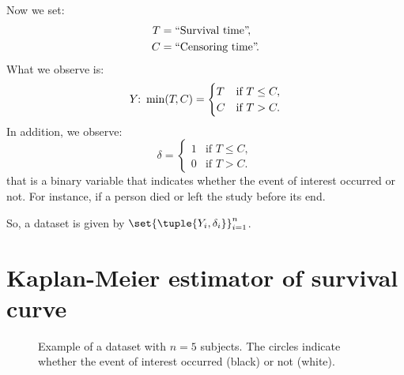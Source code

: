 Now we set:
\begin{equation}
    \begin{aligned}
        T & = \text{``Survival time''}\negthinspace,  \\
        C & = \text{``Censoring time''}\negthinspace.
    \end{aligned}
\end{equation}
What we observe is:
\begin{equation}
    Y\negthinspace\colon \min(T\negthinspace, C) = \begin{cases}
        T & \text{if } T \leq C, \\
        C & \text{if } T > C.
    \end{cases}
\end{equation}
In addition, we observe:
\begin{equation}
    \delta = \begin{cases}
        1 & \text{if } T \leq C, \\
        0 & \text{if } T > C.
    \end{cases}
\end{equation}
that is a binary variable that indicates whether the event of interest occurred or not. For instance, if a person died or left the study before its end.

So, a dataset is given by $\set{\tuple{Y_i, \delta_i}}_{i=1}^n$.

\section{Kaplan-Meier estimator of survival curve}

\begin{figure}[ptb]
    \centering
    \caption{Example of a dataset with $n=5$ subjects. The circles indicate whether the event of interest occurred (black) or not (white).}
\end{figure}

